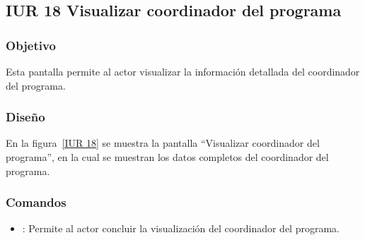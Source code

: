 \subsection{IUR 18 Visualizar coordinador del programa}

\subsubsection{Objetivo}

    Esta pantalla permite al actor  visualizar la información detallada del coordinador del programa.

\subsubsection{Diseño}


    En la figura~\ref{IUR 18} se muestra la pantalla ``Visualizar coordinador del programa'', en la cual se muestran los datos completos del coordinador del programa.
    


\subsubsection{Comandos}
    \begin{itemize}
	
	\item {}: Permite al actor concluir la visualización del coordinador del programa. 
    \end{itemize}

